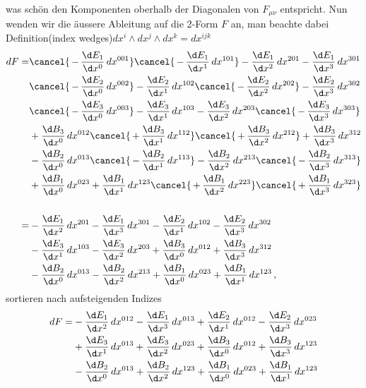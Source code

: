 was schön den Komponenten oberhalb der Diagonalen von $F_{\mu\nu}$ entspricht.
Nun wenden wir die äussere Ableitung auf die 2-Form $F$ an, man beachte dabei Definition(index wedges)$dx^i \wedge dx^j \wedge dx^k = dx^{ijk}$
 \begin{align*}
 	dF =
 	&\cancel{\, - \, \frac{\d E_1}{\d x^0} \, dx^{001}} \cancel{\, - \, \frac{\d E_1}{\d x^1} \, dx^{101}}
 	 - \frac{\d E_1}{\d x^2} \, dx^{201} - \frac{\d E_1}{\d x^3} \, dx^{301}
 	\\
 	&\cancel{\, - \, \frac{\d E_2}{\d x^0} \, dx^{002}} - \frac{\d E_2}{\d x^1} \, dx^{102}
 	 \cancel{\, - \, \frac{\d E_2}{\d x^2} \, dx^{202}} - \frac{\d E_2}{\d x^3} \, dx^{302}
 	\\
 	&\cancel{\, - \, \frac{\d E_3}{\d x^0} \, dx^{003}} - \frac{\d E_3}{\d x^1} \, dx^{103}
 	 - \frac{\d E_3}{\d x^2} \, dx^{203} \cancel{\, - \, \frac{\d E_3}{\d x^3} \, dx^{303}}
 	\\
 	&+ \frac{\d B_3}{\d x^0} \, dx^{012} \cancel{\, + \, \frac{\d B_3}{\d x^1} \, dx^{112}}
 	 \cancel{\, + \, \frac{\d B_3}{\d x^2} \, dx^{212}} + \frac{\d B_3}{\d x^3} \, dx^{312}
 	\\
 	&- \frac{\d B_2}{\d x^0} \, dx^{013} \cancel{\, - \, \frac{\d B_2}{\d x^1} \, dx^{113}}
 	 - \frac{\d B_2}{\d x^2} \, dx^{213} \cancel{\, - \, \frac{\d B_2}{\d x^3} \, dx^{313}}
 	\\
 	&+ \frac{\d B_1}{\d x^0} \, dx^{023} + \frac{\d B_1}{\d x^1} \, dx^{123}
 	 \cancel{\, + \, \frac{\d B_1}{\d x^2} \, dx^{223}} \cancel{\, + \, \frac{\d B_1}{\d x^3} \, dx^{323}} %
 	\\
 	\\
 	=
 	&- \frac{\d E_1}{\d x^2} \, dx^{201} - \frac{\d E_1}{\d x^3} \, dx^{301}
 	 - \frac{\d E_2}{\d x^1} \, dx^{102} - \frac{\d E_2}{\d x^3} \, dx^{302}
 	\\
 	&- \frac{\d E_3}{\d x^1} \, dx^{103} - \frac{\d E_3}{\d x^2} \, dx^{203}
 	 + \frac{\d B_3}{\d x^0} \, dx^{012} + \frac{\d B_3}{\d x^3} \, dx^{312}
 	\\
 	&- \frac{\d B_2}{\d x^0} \, dx^{013} - \frac{\d B_2}{\d x^2} \, dx^{213}
 	 + \frac{\d B_1}{\d x^0} \, dx^{023} + \frac{\d B_1}{\d x^1} \, dx^{123} \, , 
 \end{align*}
sortieren nach aufsteigenden Indizes
 \begin{align*}
	dF =
	&- \frac{\d E_1}{\d x^2} \, dx^{012} - \frac{\d E_1}{\d x^3} \, dx^{013}
	 + \frac{\d E_2}{\d x^1} \, dx^{012} - \frac{\d E_2}{\d x^3} \, dx^{023}
	\\
	&+ \frac{\d E_3}{\d x^1} \, dx^{013} + \frac{\d E_3}{\d x^2} \, dx^{023}
	 + \frac{\d B_3}{\d x^0} \, dx^{012} + \frac{\d B_3}{\d x^3} \, dx^{123}
	\\
	&- \frac{\d B_2}{\d x^0} \, dx^{013} + \frac{\d B_2}{\d x^2} \, dx^{123}
	 + \frac{\d B_1}{\d x^0} \, dx^{023} + \frac{\d B_1}{\d x^1} \, dx^{123}
\end{align*}
